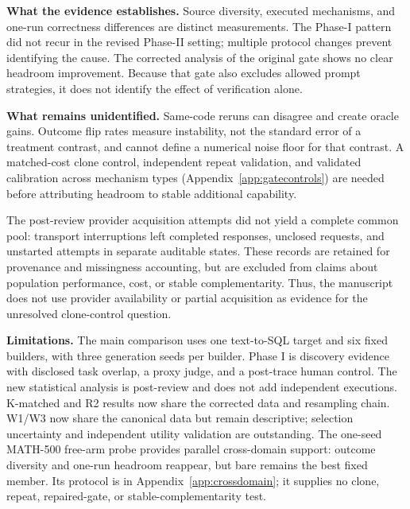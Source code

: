 \textbf{What the evidence establishes.} Source diversity, executed
mechanisms, and one-run correctness differences are distinct measurements.
The Phase-I pattern did not recur in the revised Phase-II setting; multiple
protocol changes prevent identifying the cause. The corrected analysis of
the original gate shows no clear headroom improvement. Because that gate
also excludes allowed prompt strategies, it does not identify the effect
of verification alone.

\textbf{What remains unidentified.} Same-code reruns can disagree and
create oracle gains. Outcome flip rates measure instability, not the
standard error of a treatment contrast, and cannot define a numerical
noise floor for that contrast. A matched-cost clone control, independent
repeat validation, and validated calibration across mechanism types
(Appendix~\ref{app:gatecontrols})
are needed before attributing headroom to stable additional capability.


The post-review provider acquisition attempts did not yield a complete common pool: transport interruptions left completed responses, unclosed requests, and unstarted attempts in separate auditable states. These records are retained for provenance and missingness accounting, but are excluded from claims about population performance, cost, or stable complementarity. Thus, the manuscript does not use provider availability or partial acquisition as evidence for the unresolved clone-control question.

\textbf{Limitations.} The main comparison uses one text-to-SQL target and
six fixed builders, with three generation seeds per builder. Phase I is
discovery evidence with disclosed task overlap, a proxy judge, and a
post-trace human control. The new statistical analysis is post-review and
does not add independent executions. K-matched and R2 results now share the
corrected data and resampling chain. W1/W3 now share the canonical data
but remain descriptive; selection uncertainty and independent utility
validation are outstanding.
The one-seed MATH-500 free-arm probe provides parallel cross-domain
support: outcome diversity and one-run headroom reappear, but bare remains
the best fixed member. Its protocol is in Appendix~\ref{app:crossdomain};
it supplies no clone, repeat, repaired-gate, or stable-complementarity test.
